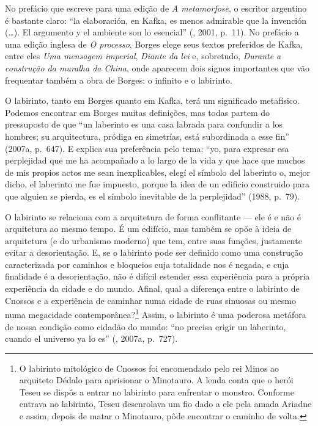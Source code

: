 No prefácio que escreve para uma edição de \emph{A metamorfose}, o
escritor argentino é bastante claro: ``la elaboración, en Kafka, es
menos admirable que la invención (\ldots{}). El argumento y el ambiente son
lo esencial'' (, 2001, p.~11). No prefácio a uma edição inglesa de
\emph{O processo}, Borges elege seus textos preferidos de Kafka, entre
eles \emph{Uma mensagem imperial}, \emph{Diante da lei} e, sobretudo,
\emph{Durante a construção da muralha da China}, onde aparecem dois
signos importantes que vão frequentar também a obra de Borges: o
infinito e o labirinto.

O labirinto, tanto em Borges quanto em Kafka, terá um significado
metafísico. Podemos encontrar em Borges muitas definições, mas todas
partem do pressuposto de que ``un laberinto es una casa labrada para
confundir a los hombres; su arquitectura, pródiga en simetrías, está
subordinada a esse fin'' (2007a, p.~647). E explica sua preferência pelo
tema: ``yo, para expresar esa perplejidad que me ha acompañado a lo
largo de la vida y que hace que muchos de mis propios actos me sean
inexplicables, elegí el símbolo del laberinto o, mejor dicho, el
laberinto me fue impuesto, porque la idea de un edificio construido para
que alguien se pierda, es el símbolo inevitable de la perplejidad''
(1988, p.~79).

O labirinto se relaciona com a arquitetura de forma conflitante --- ele é
e não é arquitetura ao mesmo tempo. É um edifício, mas também se opõe à
ideia de arquitetura (e do urbanismo moderno) que tem, entre suas
funções, justamente evitar a desorientação. E, se o labirinto pode ser
definido como uma construção caracterizada por caminhos e bloqueios cuja
totalidade nos é negada, e cuja finalidade é a desorientação, não é
difícil estender essa experiência para a própria experiência da cidade e
do mundo. Afinal, qual a diferença entre o labirinto de Cnossos e a
experiência de caminhar numa cidade de ruas sinuosas ou mesmo numa
megacidade contemporânea?\footnote{O labirinto mitológico de Cnossos foi
  encomendado pelo rei Minos ao arquiteto Dédalo para aprisionar o
  Minotauro. A lenda conta que o herói Teseu se dispôs a entrar no
  labirinto para enfrentar o monstro. Conforme entrava no labirinto,
  Teseu desenrolava um fio dado a ele pela amada Ariadne e assim, depois
  de matar o Minotauro, pôde encontrar o caminho de volta.} Assim, o
labirinto é uma poderosa metáfora de nossa condição como cidadão do
mundo: ``no precisa erigir un laberinto, cuando el universo ya lo es''
(, 2007a, p.~727).

